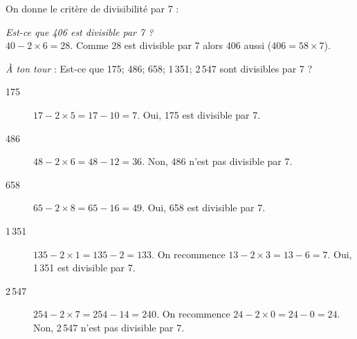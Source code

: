On donne le critère de divisibilité par 7 :
\begin{center}
\end{center}
{\em Est-ce que 406 est divisible par 7 ?}\\$40-2\times6=28$. Comme 28
est divisible par 7 alors 406 aussi ($406=58\times7$).
\par{} {\em \`A ton tour} : Est-ce que 175; 486; 658; 1\,351;
2\,547 sont divisibles par 7 ?
\begin{description}
\item[175] $17-2\times5=17-10=7$. Oui, 175 est divisible par 7.
\item[486] $48-2\times6=48-12=36$. Non, 486 n'est pas divisible par 7.
\item[658] $65-2\times8=65-16=49$. Oui, 658 est divisible par 7.
\item[1\,351] $135-2\times1=135-2=133$. On recommence
$13-2\times3=13-6=7$. Oui, 1\,351 est divisible par 7.
\item[2\,547] $254-2\times7=254-14=240$. On recommence
$24-2\times0=24-0=24$. Non, 2\,547 n'est pas divisible par 7.
\end{description}